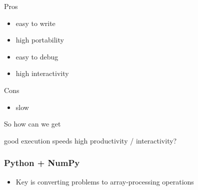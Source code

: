 \begin{frame}

    Pros

    \begin{itemize}
        \item easy to write
        \item high portability
        \item easy to debug
        \item high interactivity
    \end{itemize}

    \vspace{0.5em}

    Cons

    \begin{itemize}
        \item slow
    \end{itemize}

\end{frame}


\begin{frame}
    
    So how can we get 

    \begin{center}
    good execution speeds  high productivity / interactivity?
    \end{center}

\end{frame}

\begin{frame}
    \frametitle{Python + NumPy}

    \begin{figure}
       \begin{center} %
       \end{center}
    \end{figure}

    \begin{itemize}
        \item Key is converting problems to array-processing operations
    \end{itemize}

\end{frame}

